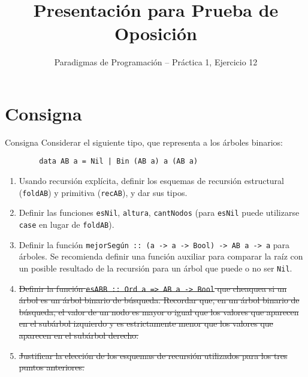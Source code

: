 \documentclass[8pt]{beamer}
\title{Presentación para Prueba de Oposición}
\subtitle{Paradigmas de Programación -- Práctica 1, Ejercicio 12}
\begin{document}
\newcommand{\code}[1]{\texttt{#1}}

\begin{frame}
    \titlepage
\end{frame}

\section{Consigna}

\begin{frame}[fragile]{Consigna}
    Considerar el siguiente tipo, que representa a los árboles binarios:
    \begin{verbatim}
        data AB a = Nil | Bin (AB a) a (AB a)
    \end{verbatim}

    \begin{enumerate}[I]
        \item<2-> Usando recursión explícita, definir los esquemas de recursión estructural (\code{foldAB}) y primitiva (\code{recAB}), y dar sus tipos.
        \item<3-> Definir las funciones \code{esNil}, \code{altura}, \code{cantNodos} (para \code{esNil} puede utilizarse \code{case} en lugar de \code{foldAB}).
        \item<4-> Definir la función \code{mejorSegún :: (a -> a -> Bool) -> AB a -> a} para árboles. Se recomienda definir una función auxiliar para comparar la raíz con un posible resultado de la recursión para un árbol que puede o no ser \code{Nil}.
        \item<5-> \st{Definir la función \texttt{esABB :: Ord a => AB a -> Bool} que cheaquea si un árbol es un árbol binario de búsqueda. Recordar que, en un árbol binario de búsqueda, el valor de un nodo es mayor o igual que los valores que aparecen en el subárbol izquierdo y es estrictamente menor que los valores que aparecen en el subárbol derecho.}
        \item<6-> \st{Justificar la elección de los esquemas de recursión utilizados para los tres puntos anteriores.}
    \end{enumerate}

\end{frame}










\end{document}
